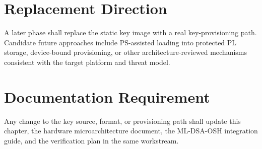 \section{Replacement Direction}
A later phase shall replace the static key image with a real key-provisioning path. Candidate future approaches include PS-assisted loading into protected PL storage, device-bound provisioning, or other architecture-reviewed mechanisms consistent with the target platform and threat model.

\section{Documentation Requirement}
Any change to the key source, format, or provisioning path shall update this chapter, the hardware microarchitecture document, the ML-DSA-OSH integration guide, and the verification plan in the same workstream.